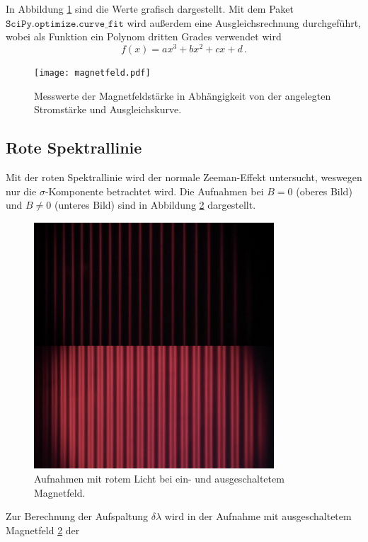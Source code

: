 \FloatBarrier
\noindent
In Abbildung \ref{fig:afig1} sind die Werte grafisch dargestellt. Mit dem Paket $\texttt{SciPy.optimize.curve\_fit}$ wird außerdem 
eine Ausgleichsrechnung durchgeführt, wobei als Funktion ein Polynom dritten Grades verwendet wird
\begin{equation*}
    f \left(x\right) = a x^3 +b x^2 +c x +d \, .
\end{equation*}
\FloatBarrier
\begin{figure}
    \centering
    \texttt{[image: magnetfeld.pdf]}
    \caption{Messwerte der Magnetfeldstärke in Abhängigkeit von der angelegten Stromstärke und Ausgleichskurve.}
    \label{fig:afig1}
\end{figure}
\FloatBarrier
\subsection{Rote Spektrallinie}
Mit der roten Spektrallinie wird der normale Zeeman-Effekt untersucht, weswegen nur die $\sigma$-Komponente betrachtet wird.
Die Aufnahmen bei $B = 0$ (oberes Bild) und $B \neq 0$ (unteres Bild) sind in Abbildung \ref{fig:afig2} dargestellt.
\FloatBarrier
\begin{figure}
    \centering
    \includegraphics[width=0.8\textwidth]{rot.jpg}
    \caption{Aufnahmen mit rotem Licht bei ein- und ausgeschaltetem Magnetfeld.}
    \label{fig:afig2}
\end{figure}
\FloatBarrier
Zur Berechnung der Aufspaltung $\delta \lambda$ wird in der Aufnahme mit ausgeschaltetem Magnetfeld \ref{fig:afig2} der 
